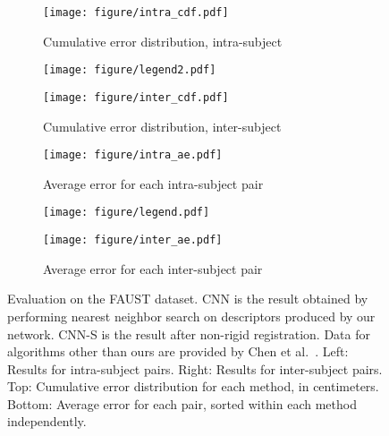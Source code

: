 \documentclass[10pt,twocolumn,letterpaper]{article}
\begin{document}
\begin{figure*}
\centering
\begin{subfigure}{.42\textwidth}
  \centering
  \texttt{[image: figure/intra\_cdf.pdf]}
  \caption{Cumulative error distribution, intra-subject}
\end{subfigure}%
\begin{subfigure}{.16\textwidth}
  \centering
  \texttt{[image: figure/legend2.pdf]}
\end{subfigure}%
\begin{subfigure}{.42\textwidth}
  \centering
  \texttt{[image: figure/inter\_cdf.pdf]}
  \caption{Cumulative error distribution, inter-subject}
\end{subfigure}

\begin{subfigure}{.42\textwidth}
  \centering
  \texttt{[image: figure/intra\_ae.pdf]}
  \caption{Average error for each intra-subject pair}
\end{subfigure}%
\begin{subfigure}{.16\textwidth}
  \centering
  \texttt{[image: figure/legend.pdf]}
\end{subfigure}%
\begin{subfigure}{.42\textwidth}
  \centering
  \texttt{[image: figure/inter\_ae.pdf]}
  \caption{Average error for each inter-subject pair}
\end{subfigure}

\caption{Evaluation on the FAUST dataset. \textsf{CNN} is the result obtained by performing nearest neighbor search on descriptors produced by our network. \textsf{CNN-S} is the result after non-rigid registration. Data for algorithms other than ours are provided by Chen et al.~\cite{chen15}. Left: Results for intra-subject pairs. Right: Results for inter-subject pairs. Top: Cumulative error distribution for each method, in centimeters. Bottom: Average error for each pair, sorted within each method independently.}
\label{fig:test}
\end{figure*}
\end{document}
